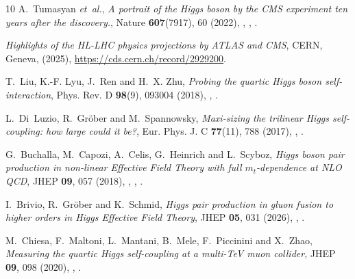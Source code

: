 \documentclass{SciPost}
\begin{document}
\begin{thebibliography}{10}
A.~Tumasyan \emph{et~al.},
\newblock \emph{{A portrait of the Higgs boson by the CMS experiment ten years after the discovery.}},
\newblock Nature \textbf{607}(7917), 60 (2022),
\newblock {},
,
\newblock {}.

\emph{{Highlights of the HL-LHC physics projections by ATLAS and CMS}},
\newblock CERN, Geneva, (2025),
\newblock \href{https://cds.cern.ch/record/2929200}{https://cds.cern.ch/record/2929200}.

T.~Liu, K.-F. Lyu, J.~Ren and H.~X. Zhu,
\newblock \emph{{Probing the quartic Higgs boson self-interaction}},
\newblock Phys. Rev. D \textbf{98}(9), 093004 (2018),
\newblock {},
\newblock {}.

L.~Di~Luzio, R.~Gr\"ober and M.~Spannowsky,
\newblock \emph{{Maxi-sizing the trilinear Higgs self-coupling: how large could it be?}},
\newblock Eur. Phys. J. C \textbf{77}(11), 788 (2017),
\newblock {},
\newblock {}.

G.~Buchalla, M.~Capozi, A.~Celis, G.~Heinrich and L.~Scyboz,
\newblock \emph{{Higgs boson pair production in non-linear Effective Field Theory with full $m_t$-dependence at NLO QCD}},
\newblock JHEP \textbf{09}, 057 (2018),
\newblock {},
,
\newblock {}.

I.~Brivio, R.~Gr{\"o}ber and K.~Schmid,
\newblock \emph{{Higgs pair production in gluon fusion to higher orders in Higgs Effective Field Theory}},
\newblock JHEP \textbf{05}, 031 (2026),
\newblock {},
\newblock {}.

M.~Chiesa, F.~Maltoni, L.~Mantani, B.~Mele, F.~Piccinini and X.~Zhao,
\newblock \emph{{Measuring the quartic Higgs self-coupling at a multi-TeV muon collider}},
\newblock JHEP \textbf{09}, 098 (2020),
\newblock {},
\newblock {}.

\end{thebibliography}
\end{document}
